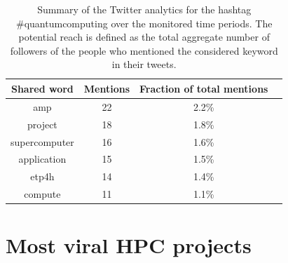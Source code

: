\begin{table}[t]
 \begin{center}
 {\scriptsize
  \begin{tabular}{cccc}
   \hline 
   \hline
   Shared word & Mentions & Fraction of total mentions \\ 
   \hline
   \hline
   amp & 22 & 2.2\% \\
   project & 18 & 1.8\% \\
   supercomputer & 16 & 1.6\% \\
   application & 15 & 1.5\% \\
   etp4h & 14 & 1.4\% \\
   compute & 11 & 1.1\% \\
   \hline
   \hline
  \end{tabular}
 } 
 \end{center} 
 \caption{Summary of the Twitter analytics for the hashtag \#quantumcomputing over the monitored time periods. The potential reach is defined as the total aggregate number of followers of the people who mentioned the considered keyword in their tweets.}
\label{Most_shared_words} 
\end{table}

\section{Most viral HPC projects}

